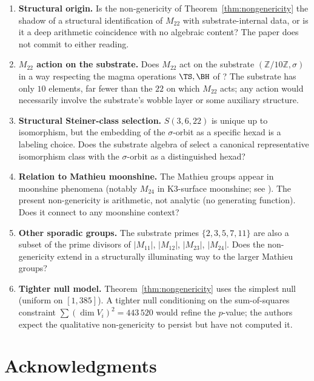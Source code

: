 \documentclass[11pt,reqno]{amsart}
\theoremstyle{plain}
\theoremstyle{definition}
\theoremstyle{remark}
\newcommand{\Z}{\mathbb{Z}}
\newcommand{\Mtwentytwo}{M_{22}}
\newcommand{\sig}{\sigma}
\begin{document}
\begin{enumerate}
\item \textbf{Structural origin.} Is the non-genericity of
Theorem~\ref{thm:nongenericity} the shadow of a structural
identification of $\Mtwentytwo$ with substrate-internal data, or is
it a deep arithmetic coincidence with no algebraic content? The
paper does not commit to either reading.

\item \textbf{$\Mtwentytwo$ action on the substrate.} Does
$\Mtwentytwo$ act on the substrate $(\Z/10\Z, \sig)$ in a way
respecting the magma operations $\TS, \BH$ of
\cite{SandersGishFourCore}? The substrate has only $10$ elements,
far fewer than the $22$ on which $\Mtwentytwo$ acts; any action
would necessarily involve the substrate's wobble layer or some
auxiliary structure.

\item \textbf{Structural Steiner-class selection.} $S(3, 6, 22)$ is
unique up to isomorphism, but the embedding of the $\sig$-orbit as
a specific hexad is a labeling choice. Does the substrate algebra
of \cite{SandersGishFourCore} select a canonical representative
isomorphism class with the $\sig$-orbit as a distinguished hexad?

\item \textbf{Relation to Mathieu moonshine.} The Mathieu groups
appear in moonshine phenomena (notably $M_{24}$ in K3-surface
moonshine; see \cite{Eguchi2011}). The present non-genericity is
arithmetic, not analytic (no generating function). Does it connect
to any moonshine context?

\item \textbf{Other sporadic groups.} The substrate primes
$\{2, 3, 5, 7, 11\}$ are also a subset of the prime divisors of
$|M_{11}|$, $|M_{12}|$, $|M_{23}|$, $|M_{24}|$. Does the
non-genericity extend in a structurally illuminating way to the
larger Mathieu groups?
\item \textbf{Tighter null model.} Theorem~\ref{thm:nongenericity}
uses the simplest null (uniform on $[1, 385]$). A tighter null
conditioning on the sum-of-squares constraint
$\sum (\dim V_{i})^{2} = 443\,520$ would refine the $p$-value; the
authors expect the qualitative non-genericity to persist but have
not computed it.
\end{enumerate}

\section*{Acknowledgments}
\end{document}
